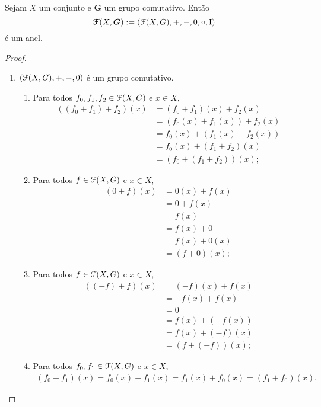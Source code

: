 \begin{proposition}
Sejam $X$ um conjunto e $\bm G$ um grupo comutativo. Então
	\begin{equation*}
	\bm{\mathcal{F}}(X,\bm G) := (\mathcal{F}(X,G),+,-,0,\circ,\mathrm{I})
	\end{equation*}
é um anel.
\end{proposition}
\begin{proof}
	\begin{enumerate}
	\item $(\mathcal{F}(X,G),+,-,0)$ é um grupo comutativo.
		\begin{enumerate}
		\item Para todos $f_0,f_1,f_2 \in \mathcal{F}(X,G)$ e $x \in X$,
			\begin{align*}
			((f_0+f_1)+f_2)(x) &= (f_0+f_1)(x)+f_2(x) \\
				&= (f_0(x)+f_1(x))+f_2(x) \\
				&= f_0(x)+(f_1(x)+f_2(x)) \\
				&= f_0(x)+(f_1+f_2)(x) \\
				&= (f_0+(f_1+f_2))(x);
			\end{align*}
		\item Para todos $f \in \mathcal{F}(X,G)$ e $x \in X$,
			\begin{align*}
			(0+f)(x) &= 0(x)+f(x) \\
				&= 0+f(x) \\
				&= f(x) \\
				&= f(x)+0 \\
				&= f(x)+0(x) \\
				&= (f+0)(x);
			\end{align*}
		\item Para todos $f \in \mathcal{F}(X,G)$ e $x \in X$,
			\begin{align*}
			((-f)+f)(x) &= (-f)(x)+f(x) \\
				&= -f(x)+f(x) \\
				&= 0 \\
				&= f(x)+(-f(x)) \\
				&= f(x) + (-f)(x) \\
				&= (f+(-f))(x);				
			\end{align*}
		\item Para todos $f_0,f_1 \in \mathcal{F}(X,G)$ e $x \in X$,
			\begin{align*}
			(f_0+f_1)(x) = f_0(x)+f_1(x) = f_1(x) + f_0(x) = (f_1+f_0)(x).
			\end{align*}
		\end{enumerate}
	

\end{enumerate}
\end{proof}
